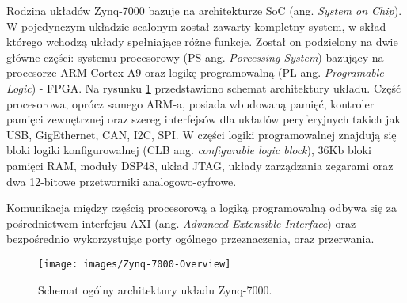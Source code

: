 Rodzina układów Zynq-7000 bazuje na architekturze SoC (ang. \textit{System on Chip}). W pojedynczym układzie scalonym został zawarty kompletny system, w skład którego wchodzą układy spełniające różne funkcje. Został on podzielony na dwie główne części: systemu procesorowy (PS ang. \textit{Porcessing System}) bazujący na procesorze ARM Cortex-A9 oraz logikę programowalną (PL ang. \textit{Programable Logic}) - FPGA. %
Na rysunku \ref{fig:zynq7000} przedstawiono schemat architektury układu. %
Część procesorowa, oprócz samego ARM-a, posiada wbudowaną pamięć, kontroler pamięci zewnętrznej oraz szereg interfejsów dla układów peryferyjnych takich jak USB, GigEthernet, CAN, I2C, SPI. %
W części logiki programowalnej znajdują się bloki logiki konfigurowalnej (CLB ang. \textit{configurable logic block}), 36Kb bloki pamięci RAM, moduły DSP48, układ JTAG, układy zarządzania zegarami oraz dwa 12-bitowe przetworniki analogowo-cyfrowe.

Komunikacja między częścią procesorową a logiką programowalną odbywa się za pośrednictwem interfejsu AXI (ang. \textit{Advanced Extensible Interface}) oraz bezpośrednio wykorzystując porty ogólnego przeznaczenia, oraz przerwania.

\begin{figure}[h]
\centering
\texttt{[image: images/Zynq-7000-Overview]}
\caption{Schemat ogólny architektury układu Zynq-7000.}
\label{fig:zynq7000}
\end{figure}

